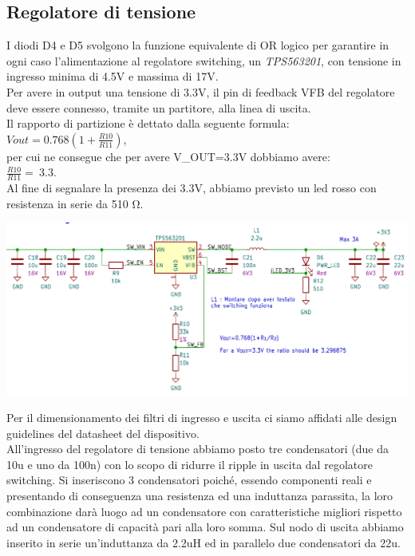 \hypertarget{regolatore-di-tensione}{%
\subsection{\texorpdfstring{Regolatore di tensione}{Regolatore di tensione}}\label{regolatore-di-tensione}}

I diodi D4 e D5 svolgono la funzione equivalente di OR logico per garantire in ogni caso l’alimentazione al regolatore switching,
un \emph{TPS563201}, con tensione in ingresso minima di 4.5V e massima di 17V.\\
Per avere in output una tensione di 3.3V, il pin di feedback VFB del regolatore deve essere connesso, tramite un partitore, alla linea di uscita.\\
Il rapporto di partizione è dettato dalla seguente formula:\\
\(Vout = 0.768(1 + \frac{R10}{R11})\),\\
per cui ne consegue che per avere V\_OUT=3.3V dobbiamo avere:\\
\(\frac{R10}{R11} = \ 3.3\).\\

\noindent Al fine di segnalare la presenza dei 3.3V, abbiamo previsto un led rosso
con resistenza in serie da 510 Ω.

\begin{center}
\includegraphics[scale=0.35]{figures/image103.png}
\captionsetup{type=figure}
\end{center}

\noindent Per il dimensionamento dei filtri di ingresso e uscita ci siamo affidati alle 
design guidelines del datasheet del dispositivo.\\
All'ingresso del regolatore di tensione abbiamo posto tre condensatori
(due da 10u e uno da 100n) con lo scopo di ridurre il ripple in uscita dal regolatore switching. 
Si inseriscono 3 condensatori poiché, essendo
componenti reali e presentando di conseguenza una resistenza ed una
induttanza parassita, la loro combinazione darà luogo ad un condensatore
con caratteristiche migliori rispetto ad un condensatore di capacità
pari alla loro somma.
Sul nodo di uscita abbiamo inserito in serie 
un’induttanza da 2.2uH ed in parallelo due condensatori da 22u.

